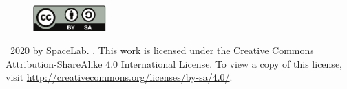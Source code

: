 \vfill

\begin{figure}[!h]
	\begin{center}
		\includegraphics[width=0.25\textwidth]{figures/by-sa.pdf}
	\end{center}
\end{figure}

\textcopyright\  2020 by SpaceLab. \thetitle. This work is licensed under the Creative Commons Attribution-ShareAlike 4.0 International License. To view a copy of this license, visit \href{http://creativecommons.org/licenses/by-sa/4.0/}{http://creativecommons.org/licenses/by-sa/4.0/}.
